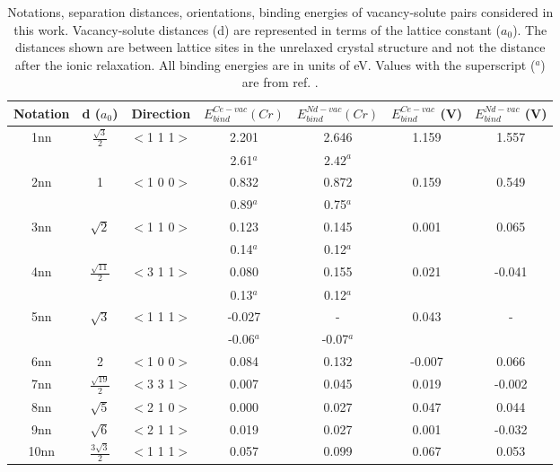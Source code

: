 \documentclass[preprint,12pt]{elsarticle}
\begin{document}
\begin{table}[h!]
    \centering
    \caption{Notations, separation distances, orientations, binding energies of vacancy-solute pairs considered in this work. Vacancy-solute distances (d) are represented in terms of the lattice constant ($a_0$). The distances shown are between lattice sites in the unrelaxed crystal structure and not the distance after the ionic relaxation. All binding energies are in units of eV. Values with the superscript ($^a$) are from ref. \citep{yang_significant_2023}.}
    \begin{tabular}{|c|c|c|c|c|c|c|}
    \hline
       Notation & d ($a_0$) & Direction&  $E_{bind}^{Ce-vac} (Cr)$ & $E_{bind}^{Nd-vac} (Cr)$ &$E_{bind}^{Ce-vac}$ (V)&$E_{bind}^{Nd-vac}$ (V) \\
        \hline
       1nn &$\frac{\sqrt{3}}{2}$ & $<$1 1 1$>$ & 2.201 &2.646 &1.159 &1.557 \\
       &&&2.61$^a$ &$2.42^a$ & & \\
       \hline
       2nn &1 & $<$1 0 0$>$ &0.832 &0.872 &0.159 &0.549 \\
       &&&0.89$^a$ &0.75$^a$ && \\
       \hline
       3nn &$\sqrt{2}$ &$<$1 1 0$>$  &0.123 &0.145 &0.001 &0.065 \\
       &&&0.14$^a$ & 0.12$^a$&& \\
       \hline
       4nn &$\frac{\sqrt{11}}{2}$ & $<$3 1 1$>$ & 0.080 &0.155 &0.021 &-0.041 \\
       &&&0.13$^a$ & 0.12$^a$ && \\
       \hline
       5nn &$\sqrt{3}$ & $<$1 1 1$>$  &-0.027 & - &0.043 & -\\
       &&&-0.06$^a$ &-0.07$^a$ && \\
       \hline
       6nn &2 & $<$1 0 0$>$ &0.084 &0.132 &-0.007 &0.066 \\
       \hline
       7nn &$\frac{\sqrt{19}}{2}$ & $<$3 3 1$>$ &0.007 &0.045 &0.019 &-0.002 \\
       \hline
       8nn &$\sqrt{5}$ &$<$2 1 0$>$ &0.000 &0.027 &0.047 &0.044 \\
       \hline
       9nn &$\sqrt{6}$ & $<$2 1 1$>$  &0.019 &0.027 &0.001 &-0.032 \\
       \hline
      10nn &$\frac{3\sqrt{3}}{2}$ & $<$1 1 1$>$ &0.057 &0.099 &0.067 &0.053 \\
      \hline
    \end{tabular}
    \label{tab:configurations_binding_cr_v}
\end{table}
\end{document}
